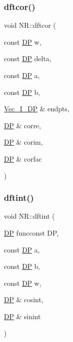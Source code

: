 \mbox{\label{namespaceNR_a1c902ada2900da8c449d3901707c075b}} 
\subsubsection{\texorpdfstring{dftcor()}{dftcor()}}
{\footnotesize\ttfamily void N\+R\+::dftcor (\begin{DoxyParamCaption}\item[{const \mbox{\hyperlink{namespaceNR_af6ff762dd605ff477b8e52387253a02a}{DP}}}]{w,  }\item[{const \mbox{\hyperlink{namespaceNR_af6ff762dd605ff477b8e52387253a02a}{DP}}}]{delta,  }\item[{const \mbox{\hyperlink{namespaceNR_af6ff762dd605ff477b8e52387253a02a}{DP}}}]{a,  }\item[{const \mbox{\hyperlink{namespaceNR_af6ff762dd605ff477b8e52387253a02a}{DP}}}]{b,  }\item[{\mbox{\hyperlink{namespaceNR_a9f943da53862537c552e2a770cb170ae}{Vec\+\_\+\+I\+\_\+\+DP}} \&}]{endpts,  }\item[{\mbox{\hyperlink{namespaceNR_af6ff762dd605ff477b8e52387253a02a}{DP}} \&}]{corre,  }\item[{\mbox{\hyperlink{namespaceNR_af6ff762dd605ff477b8e52387253a02a}{DP}} \&}]{corim,  }\item[{\mbox{\hyperlink{namespaceNR_af6ff762dd605ff477b8e52387253a02a}{DP}} \&}]{corfac }\end{DoxyParamCaption})}

\mbox{\label{namespaceNR_ae09a210159f99a027ae6554b6a605e5b}} 
\subsubsection{\texorpdfstring{dftint()}{dftint()}}
{\footnotesize\ttfamily void N\+R\+::dftint (\begin{DoxyParamCaption}\item[{\mbox{\hyperlink{namespaceNR_af6ff762dd605ff477b8e52387253a02a}{DP}} }]{funcconst DP,  }\item[{const \mbox{\hyperlink{namespaceNR_af6ff762dd605ff477b8e52387253a02a}{DP}}}]{a,  }\item[{const \mbox{\hyperlink{namespaceNR_af6ff762dd605ff477b8e52387253a02a}{DP}}}]{b,  }\item[{const \mbox{\hyperlink{namespaceNR_af6ff762dd605ff477b8e52387253a02a}{DP}}}]{w,  }\item[{\mbox{\hyperlink{namespaceNR_af6ff762dd605ff477b8e52387253a02a}{DP}} \&}]{cosint,  }\item[{\mbox{\hyperlink{namespaceNR_af6ff762dd605ff477b8e52387253a02a}{DP}} \&}]{sinint }\end{DoxyParamCaption})}

